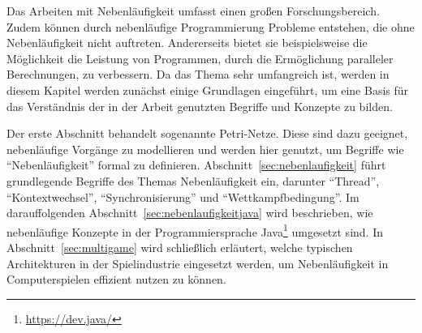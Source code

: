 Das Arbeiten mit Nebenläufigkeit umfasst einen großen Forschungsbereich. Zudem können durch nebenläufige Programmierung Probleme entstehen, die ohne Nebenläufigkeit nicht auftreten. Andererseits bietet sie beispielsweise die Möglichkeit die Leistung von Programmen, durch die Ermöglichung paralleler Berechnungen, zu verbessern. Da das Thema sehr umfangreich ist, werden in diesem Kapitel werden zunächst einige Grundlagen eingeführt, um eine Basis für das Verständnis der in der Arbeit genutzten Begriffe und Konzepte zu bilden. 

Der erste Abschnitt behandelt sogenannte Petri-Netze. Diese sind dazu geeignet, nebenläufige Vorgänge zu modellieren und werden hier genutzt, um Begriffe wie \enquote{Nebenläufigkeit} formal zu definieren. Abschnitt~\ref{sec:nebenlaufigkeit} führt grundlegende Begriffe des Themas Nebenläufigkeit ein, darunter \enquote{Thread}, \enquote{Kontextwechsel}, \enquote{Synchronisierung} und \enquote{Wettkampfbedingung}. Im darauffolgenden Abschnitt~\ref{sec:nebenlaufigkeitjava} wird beschrieben, wie nebenläufige Konzepte in der Programmiersprache Java\footnote{\url{https://dev.java/}} umgesetzt sind. In Abschnitt~\ref{sec:multigame} wird schließlich erläutert, welche typischen Architekturen in der Spielindustrie eingesetzt werden, um Nebenläufigkeit in Computerspielen effizient nutzen zu können.